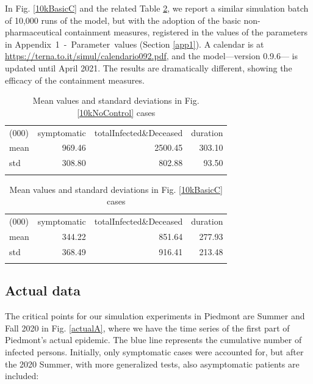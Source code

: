 \documentclass[graybox]{svmult}
\begin{document}
In Fig. \ref{10kBasicC} and the related Table \ref{basicCTab}, we report a similar simulation batch of 10,000 runs of the model, but with the adoption of the basic non-pharmaceutical containment measures, registered in the values of the parameters in Appendix~1~-~Parameter~values (Section \ref{app1}). A calendar is at \href{https://terna.to.it/simul/calendario092.pdf}{https://terna.to.it/simul/calendario092.pdf}, and the model---version 0.9.6--- is updated until April 2021. The results are dramatically different, showing the efficacy of the containment measures. 


\begin{table}[t]
\center
\begin{tabular}{lrrr}
\hline\noalign{\smallskip}
(000) & symptomatic & totalInfected\&Deceased & duration \\
\noalign{\smallskip}\svhline\noalign{\smallskip}
mean & 969.46 & 2500.45 & 303.10 \\
std & 308.80 & 802.88 & 93.50 \\
\hline\noalign{\smallskip}
\end{tabular}
\caption{Mean values and standard deviations in Fig. \ref{10kNoControl} cases}
\label{noCTab}
\end{table}


\begin{table}[t]
\center
\begin{tabular}{lrrr}
\hline\noalign{\smallskip}
(000) & symptomatic & totalInfected\&Deceased & duration \\
\noalign{\smallskip}\svhline\noalign{\smallskip}
mean & 344.22 & 851.64 & 277.93 \\
std & 368.49 & 916.41 & 213.48 \\
\hline\noalign{\smallskip}
\end{tabular}
\caption{Mean values and standard deviations in Fig. \ref{10kBasicC} cases}
\label{basicCTab}
\end{table}


\subsection{Actual data}
\label{actual}

The critical points for our simulation experiments in Piedmont are Summer and Fall 2020 in Fig. \ref{actualA}, where we have the time series of the first part of Piedmont's actual epidemic. The blue line represents the cumulative number of infected persons. Initially, only symptomatic cases were accounted for, but after the 2020 Summer, with more generalized tests, also asymptomatic patients are included:
\end{document}

